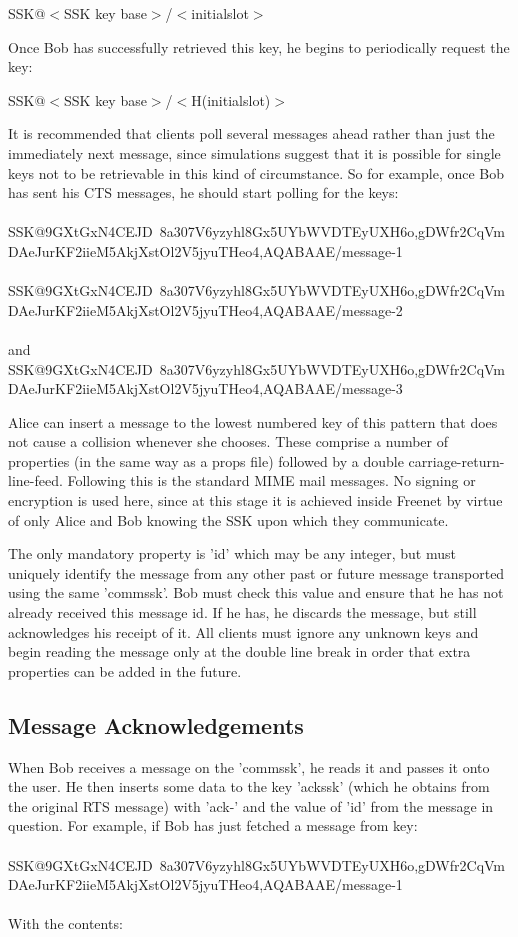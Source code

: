 \documentclass[12pt,a4paper]{article}
\begin{document}
SSK@$<$SSK key base$>$/$<$initialslot$>$

Once Bob has successfully retrieved this key, he begins to periodically request the key:

SSK@$<$SSK key base$>$/$<$H(initialslot)$>$

It is recommended that clients poll several messages ahead rather than just the immediately next
message, since simulations suggest that it is possible for single keys not to be retrievable in this
kind of circumstance. So for example, once Bob has sent his CTS messages, he should start polling
for the keys: \\
\\
SSK@9GXtGxN4CEJD~8a\-307V6yzyhl8Gx5U\-YbWVDTEyUXH6o,gDWfr2CqVm\-
DAeJurKF2iieM\-5AkjXstOl2V5j\-yuTHeo4,AQABAAE/message-1 \\
\\
SSK@9GXtGxN4CEJD~8a\-307V6yzyhl8Gx5U\-YbWVDTEyUXH6o,gDWfr2CqVm\-
DAeJurKF2iieM\-5AkjXstOl2V5j\-yuTHeo4,AQABAAE/message-2 \\
\\
and \\
SSK@9GXtGxN4CEJD~8a\-307V6yzyhl8Gx5U\-YbWVDTEyUXH6o,gDWfr2CqVm\-
DAeJurKF2iieM\-5AkjXstOl2V5j\-yuTHeo4,AQABAAE/message-3

Alice can insert a message to the lowest numbered key of this pattern that does not cause a
collision whenever she chooses. These comprise a number of properties (in the same way as a props
file) followed by a double carriage-return-line-feed. Following this is the standard MIME mail
messages. No signing or encryption is used here, since at this stage it is achieved inside Freenet
by virtue of only Alice and Bob knowing the SSK upon which they communicate.

The only mandatory property is 'id' which may be any integer, but must uniquely identify the message
from any other past or future message transported using the same 'commssk'. Bob must check this
value and ensure that he has not already received this message id. If he has, he discards the
message, but still acknowledges his receipt of it. All clients must ignore any unknown keys and
begin reading the message only at the double line break in order that extra properties can be added
in the future.

\subsection{Message Acknowledgements}
When Bob receives a message on the 'commssk', he reads it and passes it onto the user. He then
inserts some data to the key 'ackssk' (which he obtains from the original RTS message) with 'ack-'
and the value of 'id' from the message in question. For example, if Bob has just fetched a message
from key: \\
\\
SSK@9GXtGxN4CEJD~8a\-307V6yzyhl8Gx5U\-YbWVDTEyUXH6o,gDWfr2CqVm\-
DAeJurKF2iieM\-5AkjXstOl2V5j\-yuTHeo4,AQABAAE/message-1 \\
\\
With the contents: \\
\\
\end{document}
